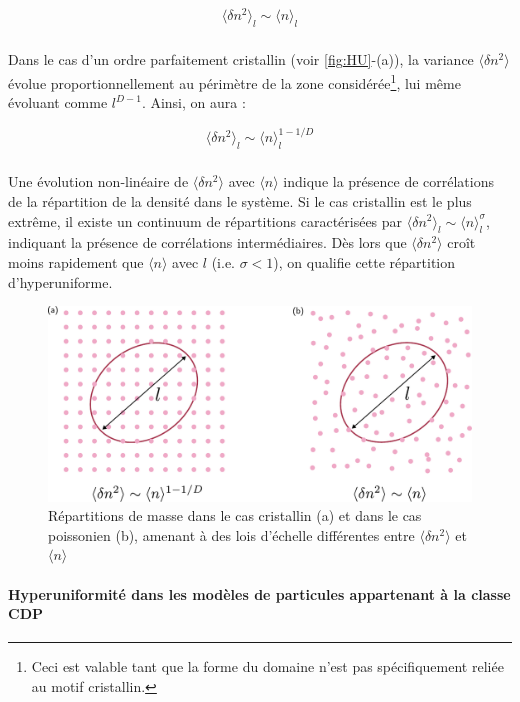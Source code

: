 \begin{equation}
	\langle \delta n^2 \rangle_l \sim \langle n \rangle_l
\end{equation} 

\subparagraph{}Dans le cas d'un ordre parfaitement cristallin (voir \autoref{fig:HU}-(a)), la variance $\langle \delta n^2 \rangle$ évolue proportionnellement au périmètre de la zone considérée\footnote{Ceci est valable tant que la forme du domaine n'est pas spécifiquement reliée au motif cristallin.}, lui même évoluant comme $l^{D-1}$. Ainsi, on aura :

\begin{equation}
	\langle \delta n^2 \rangle_l \sim \langle n \rangle_l^{1-1/D}
\end{equation} 

\subparagraph{}Une évolution non-linéaire de $\langle \delta n^2 \rangle$ avec $\langle n \rangle$ indique la présence de corrélations de la répartition de la densité dans le système. Si le cas cristallin est le plus extrême, il existe un continuum de répartitions caractérisées par $\langle \delta n^2 \rangle_l \sim \langle n \rangle_l^{\sigma}$, indiquant la présence de corrélations intermédiaires. Dès lors que $\langle \delta n^2 \rangle$ croît moins rapidement que $\langle n \rangle$ avec $l$ (i.e. $\sigma < 1$), on qualifie cette répartition d'hyperuniforme.

\begin{figure}[h]
	\centering
	\includegraphics[width=\textwidth]{Chapitre1/Figures/CDP/hyperuniformite.pdf}
	\caption{Répartitions de masse dans le cas cristallin (a) et dans le cas poissonien (b), amenant à des lois d'échelle différentes entre $\langle \delta n^2 \rangle$ et $\langle n \rangle$}
	\label{fig:HU}
\end{figure}

\paragraph{Hyperuniformité dans les modèles de particules appartenant à la classe CDP}

